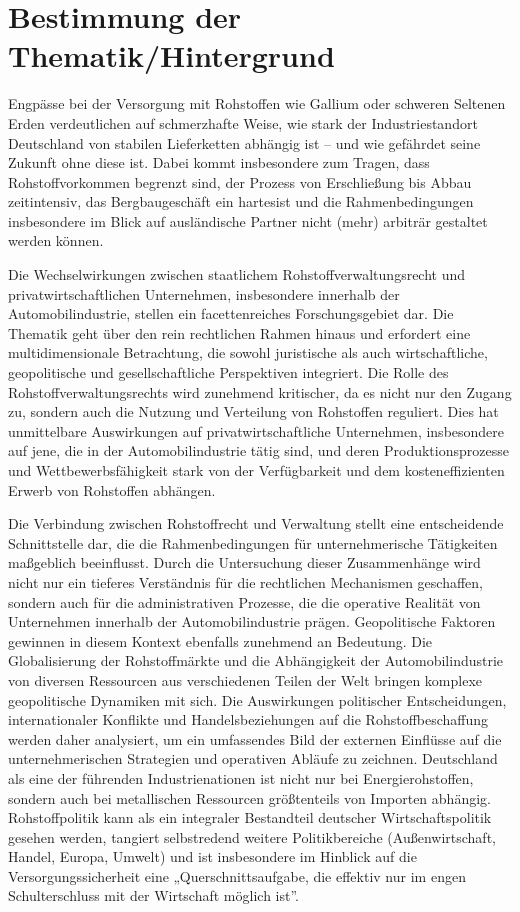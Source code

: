 \documentclass[12pt,a4paper,oneside]{book} %
\begin{document}
	
	\section{Bestimmung der Thematik/Hintergrund}
	Engpässe bei der Versorgung mit Rohstoffen wie Gallium oder schweren Seltenen Erden verdeutlichen auf schmerzhafte Weise, wie stark der Industriestandort Deutschland von stabilen Lieferketten abhängig ist – und wie gefährdet seine Zukunft ohne diese ist. Dabei kommt insbesondere zum Tragen, dass Rohstoffvorkommen begrenzt sind, der Prozess von Erschließung bis Abbau zeitintensiv, das Bergbaugeschäft ein \glqq hartes\grqq ist und die Rahmenbedingungen insbesondere im Blick auf ausländische Partner nicht (mehr) arbiträr gestaltet werden können.
	
	Die Wechselwirkungen zwischen staatlichem Rohstoffverwaltungsrecht und privatwirtschaftlichen Unternehmen, insbesondere innerhalb der Automobilindustrie, stellen ein facettenreiches Forschungsgebiet dar. Die Thematik geht über den rein rechtlichen Rahmen hinaus und erfordert eine multidimensionale Betrachtung, die sowohl juristische als auch wirtschaftliche, geopolitische und gesellschaftliche Perspektiven integriert. Die Rolle des Rohstoffverwaltungsrechts wird zunehmend kritischer, da es nicht nur den Zugang zu, sondern auch die Nutzung und Verteilung von Rohstoffen reguliert. Dies hat unmittelbare Auswirkungen auf privatwirtschaftliche Unternehmen, insbesondere auf jene, die in der Automobilindustrie tätig sind, und deren Produktionsprozesse und Wettbewerbsfähigkeit stark von der Verfügbarkeit und dem kosteneffizienten Erwerb von Rohstoffen abhängen.
	
	Die Verbindung zwischen Rohstoffrecht und Verwaltung stellt eine entscheidende Schnittstelle dar, die die Rahmenbedingungen für unternehmerische Tätigkeiten maßgeblich beeinflusst. Durch die Untersuchung dieser Zusammenhänge wird nicht nur ein tieferes Verständnis für die rechtlichen Mechanismen geschaffen, sondern auch für die administrativen Prozesse, die die operative Realität von Unternehmen innerhalb der Automobilindustrie prägen. Geopolitische Faktoren gewinnen in diesem Kontext ebenfalls zunehmend an Bedeutung. Die Globalisierung der Rohstoffmärkte und die Abhängigkeit der Automobilindustrie von diversen Ressourcen aus verschiedenen Teilen der Welt bringen komplexe geopolitische Dynamiken mit sich. Die Auswirkungen politischer Entscheidungen, internationaler Konflikte und Handelsbeziehungen auf die Rohstoffbeschaffung werden daher analysiert, um ein umfassendes Bild der externen Einflüsse auf die unternehmerischen Strategien und operativen Abläufe zu zeichnen. Deutschland als eine der führenden Industrienationen ist nicht nur bei Energierohstoffen, sondern auch bei metallischen Ressourcen größtenteils von Importen abhängig. \autocite{dauke_rohstoff-_2011} Rohstoffpolitik kann als ein integraler Bestandteil deutscher Wirtschaftspolitik gesehen werden, tangiert selbstredend weitere Politikbereiche (Außenwirtschaft, Handel, Europa, Umwelt) und ist insbesondere im Hinblick auf die Versorgungssicherheit eine „Querschnittsaufgabe, die effektiv nur im engen Schulterschluss mit der Wirtschaft möglich ist”.\autocite{dauke_rohstoff-_2011}
	
\end{document}
